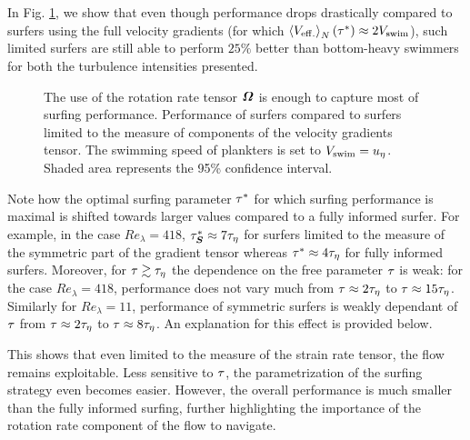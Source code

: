 In Fig. \ref{fig:surfing_partial}, we show that even though performance drops drastically compared to surfers using the full velocity gradients (for which $\left\langle V_{\mathrm{eff.}} \right\rangle_{N}(\tau^*) \approx 2 V_{\mathrm{swim}}$), such limited surfers are still able to perform $25\%$ better than bottom-heavy swimmers for both the turbulence intensities presented.
\begin{figure}%
	\centering
	
	\caption[The use of the rotation rate tensor $\GradientsAsym$ is enough to capture most of surfing performance.]{
		The use of the rotation rate tensor $\GradientsAsym$ is enough to capture most of surfing performance.
		Performance of surfers compared to surfers limited to the measure of components of the velocity gradients tensor.
		The swimming speed of plankters is set to $V_{\mathrm{swim}} = u_{\eta}$.
		Shaded area represents the 95\% confidence interval.
	}
	\label{fig:surfing_partial}
\end{figure}
Note how the optimal surfing parameter $\tau^*$ for which surfing performance is maximal is shifted towards larger values compared to a fully informed surfer.
For example, in the case $\mathit{Re}_{\lambda} = 418$, $\tau^*_{\boldsymbol{S}} \approx 7 \tau_{\eta}$ for surfers limited to the measure of the symmetric part of the gradient tensor whereas $\tau^* \approx 4 \tau_{\eta}$ for fully informed surfers.
Moreover, for $\tau \gtrsim \tau_{\eta}$ the dependence on the free parameter $\tau$ is weak: for the case $\mathit{Re}_{\lambda} = 418$, performance does not vary much from $\tau \approx 2 \tau_{\eta}$ to $\tau \approx 15 \tau_{\eta}$.
Similarly for $\mathit{Re}_{\lambda} = 11$, performance of symmetric surfers is weakly dependant of $\tau$ from $\tau \approx 2 \tau_{\eta}$ to $\tau \approx 8 \tau_{\eta}$.
An explanation for this effect is provided below.

This shows that even limited to the measure of the strain rate tensor, the flow remains exploitable.
Less sensitive to $\tau$, the parametrization of the surfing strategy even becomes easier.
However, the overall performance is much smaller than the fully informed surfing, further highlighting the importance of the rotation rate component of the flow to navigate.


